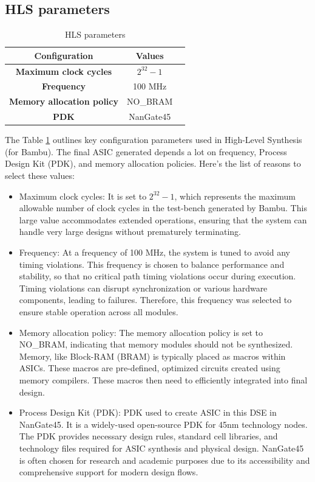 \clearpage
\subsection{HLS parameters}

\begin{table}[h!]
\caption{HLS parameters}
\centering
\label{tab:hlsParameters}
\begin{tabular}{|c|c|c|}
\hline
\textbf{Configuration} & \textbf{Values} \\ \hline
\textbf{Maximum clock cycles} & $2^{32} - 1$ \\ \hline
\textbf{Frequency} & 100 MHz \\ \hline
\textbf{Memory allocation policy} & NO\_BRAM \\ \hline
\textbf{PDK} & NanGate45 \\ \hline
\end{tabular}
\end{table}

The Table \ref{tab:hlsParameters} outlines key configuration parameters used in High-Level Synthesis (for Bambu). The final ASIC generated depends a lot on frequency, Process Design Kit (PDK), and memory allocation policies. Here's the list of reasons to select these values:

\begin{itemize}
    
    \item Maximum clock cycles: It is set to $2^{32} - 1$, which represents the maximum allowable number of clock cycles in the test-bench generated by Bambu. This large value accommodates extended operations, ensuring that the system can handle very large designs without prematurely terminating.

    \item Frequency: At a frequency of 100 MHz, the system is tuned to avoid any timing violations. This frequency is chosen to balance performance and stability, so that no critical path timing violations occur during execution. Timing violations can disrupt synchronization or various hardware components, leading to failures. Therefore, this frequency was selected to ensure stable operation across all modules.

    \item Memory allocation policy: The memory allocation policy is set to NO\_BRAM, indicating that memory modules should not be synthesized. Memory, like Block-RAM (BRAM) is typically placed as macros within ASICs. These macros are pre-defined, optimized circuits created using memory compilers. These macros then need to efficiently integrated into final design.

    \item Process Design Kit (PDK): PDK used to create ASIC in this DSE in NanGate45. It is a widely-used open-source PDK for 45nm technology nodes. The PDK provides necessary design rules, standard cell libraries, and technology files required for ASIC synthesis and physical design. NanGate45 is often chosen for research and academic purposes due to its accessibility and comprehensive support for modern design flows.
    
\end{itemize}

